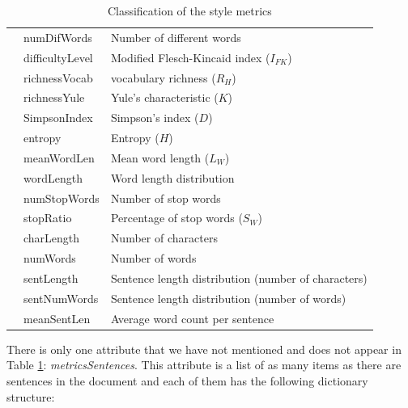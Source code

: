 \begin{table}[h]
\begin{tabular}{|l|ll|}
		& numDifWords                    & Number of different words                           \\ \cline{2-3} 
		& difficultyLevel                & Modified Flesch-Kincaid index ($I_{FK}$)                       \\ \cline{2-3} 
		& richnessVocab                  & \cite{honore1979some} vocabulary richness ($R_H$)                                     \\ \cline{2-3} 
		& richnessYule                   & Yule's characteristic ($K$)                               \\ \cline{2-3} 
		& SimpsonIndex                   & Simpson's index ($D$)                                     \\ \cline{2-3} 
		& entropy                        & Entropy ($H$)                                             \\ \cline{2-3} 
		& meanWordLen                    & Mean word length ($L_W$)                                    \\ \cline{2-3} 
		& wordLength                     & Word length distribution                            \\ \cline{2-3} 
		& numStopWords                   & Number of stop words                                \\ \cline{2-3} 
		& stopRatio                      & Percentage of stop words ($S_W$)                            \\ \hhline{|=|=|=|}
		\multirow{5}{*}{Structural}            & charLength                     & Number of characters                                \\ \cline{2-3} 
		& numWords                       & Number of words                                     \\ \cline{2-3} 
		& sentLength                     & Sentence length distribution (number of characters) \\ \cline{2-3} 
		& sentNumWords                   & Sentence length distribution (number of words)      \\ \cline{2-3} 
		& meanSentLen                    & Average word count per sentence                     \\ \hline
	\end{tabular}
\caption{Classification of the style metrics}\label{tab:sty}
\end{table}

There is only one attribute that we have not mentioned and does not appear in Table \ref{tab:sty}: \textit{metricsSentences}. This attribute is a list of as many items as there are sentences in the document and each of them has the following dictionary structure:

